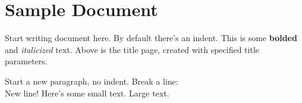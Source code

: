 \documentclass[12pt]{article}
\begin{document}
\section{Sample Document}

Start writing document here. By default there's an indent. This is some \textbf{bolded}
and \textit{italicized} text. Above is the title page, created with specified title
parameters.

\noindent Start a new paragraph, no indent. Break a line: \\ New line! Here's some 
{\small small text}. {\Large Large text.}

\blindtext
\end{document}
